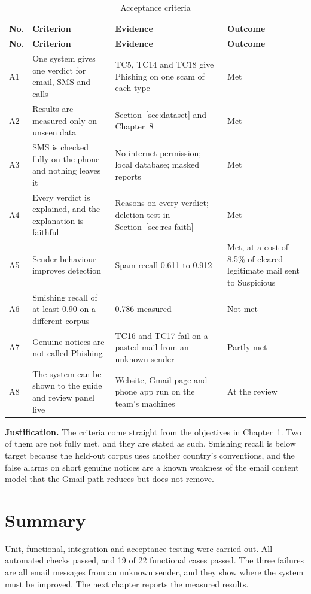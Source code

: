 {{\small{}
\begin{longtable}{|p{1.0cm}|p{5.2cm}|p{5.5cm}|p{2.2cm}|}
\caption{Acceptance criteria}\label{tab:accept}\\
\hline \textbf{No.} & \textbf{Criterion} & \textbf{Evidence} & \textbf{Outcome} \\ \hline
\endfirsthead
\hline \textbf{No.} & \textbf{Criterion} & \textbf{Evidence} & \textbf{Outcome} \\ \hline
\endhead
\hline
\endfoot
A1 & One system gives one verdict for email, SMS and calls & TC5, TC14 and TC18 give Phishing on one scam of each type & Met \\ \hline
A2 & Results are measured only on unseen data & Section~\ref{sec:dataset} and Chapter~8 & Met \\ \hline
A3 & SMS is checked fully on the phone and nothing leaves it & No internet permission; local database; masked reports & Met \\ \hline
A4 & Every verdict is explained, and the explanation is faithful & Reasons on every verdict; deletion test in Section~\ref{sec:res-faith} & Met \\ \hline
A5 & Sender behaviour improves detection & Spam recall 0.611 to 0.912 & Met, at a cost of 8.5\% of cleared legitimate mail sent to Suspicious \\ \hline
A6 & Smishing recall of at least 0.90 on a different corpus & 0.786 measured & Not met \\ \hline
A7 & Genuine notices are not called Phishing & TC16 and TC17 fail on a pasted mail from an unknown sender & Partly met \\ \hline
A8 & The system can be shown to the guide and review panel live & Website, Gmail page and phone app run on the team's machines & At the review \\ \hline
\end{longtable}
}

\textbf{Justification.} The criteria come straight from the objectives in Chapter~1. Two of them are not fully met, and they are stated as such. Smishing recall is below target because the held-out corpus uses another country's conventions, and the false alarms on short genuine notices are a known weakness of the email content model that the Gmail path reduces but does not remove.

\section{Summary}
Unit, functional, integration and acceptance testing were carried out. All automated checks passed, and 19 of 22 functional cases passed. The three failures are all email messages from an unknown sender, and they show where the system must be improved. The next chapter reports the measured results.

}
